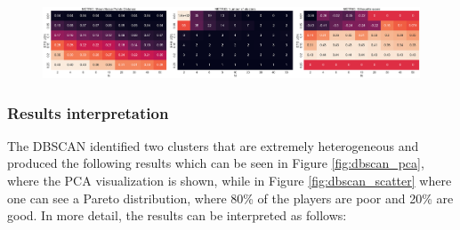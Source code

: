
\begin{figure}[h]
	\centering
	\includegraphics[width=\textwidth]{plots/dbscan/dbscan_metrics}
	\label{fig:dbscan_metrics}
\end{figure}

\subsubsection{Results interpretation}
The DBSCAN identified two clusters that are extremely heterogeneous and produced the following results which can be seen in Figure \ref{fig:dbscan_pca}, where the PCA visualization is shown, while in Figure \ref{fig:dbscan_scatter} where one can see a Pareto distribution, where 80\% of the players are poor and 20\% are good. In more detail, the results can be interpreted as follows:

